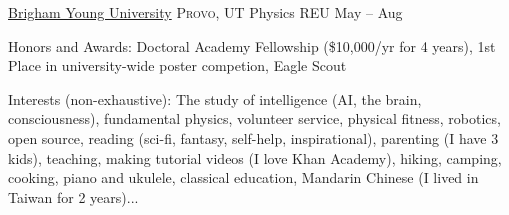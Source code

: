\documentclass[11pt,a4paper]{article}
\begin{document}
\headedsection
  {\href{http://www.byu.edu}{Brigham Young University}}
  {\textsc{Provo, UT}} {%
	  \headedsubsection
	 {Physics REU}
	 {May  -- Aug }
	 {}
}

\spacedhrule{0.2em}{0.2em}  %

\inlineheadsection
  {Honors and Awards:}
  {Doctoral Academy Fellowship (\$10,000/yr for 4 years),  1st Place in university-wide poster competion, Eagle Scout}

\inlineheadsection
  {Interests (non-exhaustive):}
  {The study of intelligence (AI, the brain, consciousness), fundamental physics, volunteer service, physical fitness, robotics, open source, 
  reading (sci-fi, fantasy, self-help, inspirational), parenting (I have 3 kids), teaching, making tutorial videos (I love Khan Academy), 
  hiking, camping, cooking, piano and ukulele, classical education, Mandarin Chinese (I lived in Taiwan for 2 years)...}
\end{document}
